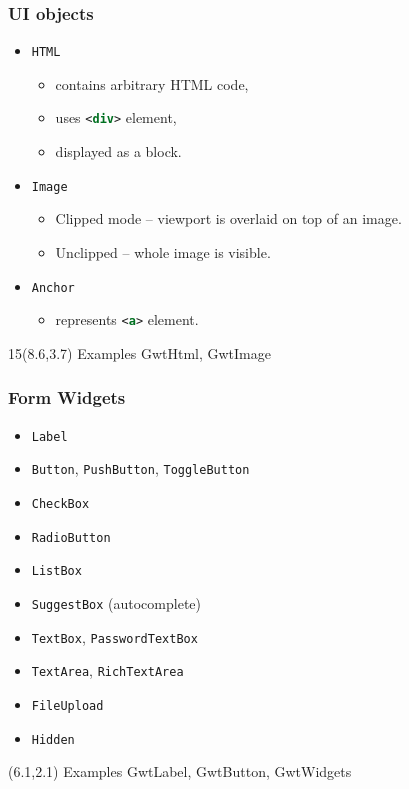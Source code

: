 \documentclass[10pt,table, xcolor=pdflatex]{beamer}
\newcommand{\inlinexml}{\lstinline[language={XML},keepspaces]}
\begin{document}
\begin{frame}\frametitle{UI objects}
	\begin{itemize}
		\item \texttt{HTML}
        \begin{itemize}
        	\item contains arbitrary HTML code,
        	\item uses \inlinexml{<div>} element,
        	\item displayed as a block.
        \end{itemize}
		\item \texttt{Image}
        \begin{itemize}
        	\item Clipped mode -- viewport is overlaid on top of an image.
        	\item Unclipped -- whole image is visible.
        \end{itemize}
		\item \texttt{Anchor}
        \begin{itemize}
        	\item represents \inlinexml{<a>} element.
        \end{itemize}
	\end{itemize}
\begin{textblock}{15}(8.6,3.7)
    {\footnotesize Examples GwtHtml, GwtImage}
\end{textblock}
\end{frame}


\begin{frame}\frametitle{Form Widgets}
	\begin{itemize}
        \item \texttt{Label}
    	\item \texttt{Button}, \texttt{PushButton}, \texttt{ToggleButton}
    	\item \texttt{CheckBox}
    	\item \texttt{RadioButton}
    	\item \texttt{ListBox}
    	\item \texttt{SuggestBox} (autocomplete)
    	\item \texttt{TextBox}, \texttt{PasswordTextBox}
    	\item \texttt{TextArea}, \texttt{RichTextArea}
    	\item \texttt{FileUpload}
    	\item \texttt{Hidden}
	\end{itemize}
\begin{textblock}{15}(6.1,2.1)
    {\footnotesize Examples GwtLabel, GwtButton, GwtWidgets}
\end{textblock}
\end{frame}
\end{document}
